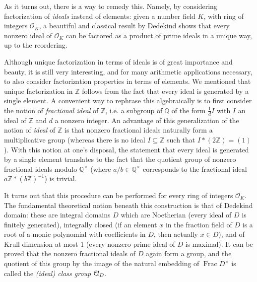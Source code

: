 \documentclass[a4paper,USenglish,cleveref, autoref, thm-restate]{lipics-v2021}
\newcommand*{\OK}[1][K]{\mathcal{O}_{#1}}
\newcommand*{\Cl}{\mathcal{C}\kern-.075em l}
\newcommand{\Q}{\mathbb{Q}}
\newcommand{\Z}{\mathbb{Z}}
\DeclareMathOperator{\Frac}{Frac}
\begin{document}
As it turns out, there is a way to remedy this. Namely, by considering factorization of \emph{ideals} instead of elements: given a number field $K$, with ring of integers $\OK$, a beautiful and classical result by Dedekind shows that every nonzero ideal of $\OK$ can be factored as a product of prime ideals in a unique way, up to the reordering.

Although unique factorization in terms of ideals is of great importance and beauty, it is still very interesting, and for many arithmetic applications necessary, to also consider factorization properties in terms of elements. We mentioned that unique factorization in $\Z$ follows from the fact that every ideal is generated by a single element. A convenient way to rephrase this algebraically is to first consider the notion of \emph{fractional ideal} of $\Z$, i.e. a subgroup of $\Q$ of the form $\frac{1}{d} I$ with $I$ an ideal of $\Z$ and $d$ a nonzero integer.
An advantage of this generalization of the notion of \emph{ideal} of $\Z$ is that nonzero fractional ideals naturally form a multiplicative group (whereas there is no ideal $I\subseteq \Z$ such that $I*(2\Z)=(1)$). With this notion at one's disposal, the statement that every ideal is generated by a single element translates to the fact that the quotient group of nonzero fractional ideals modulo $\Q^\times$ (where $a/b\in\Q^\times$ corresponds to the fractional ideal $a\Z\ast (b\Z)^{-1}$) is trivial.

It turns out that this procedure can be %
performed for every ring of integers $\OK$. The fundamental theoretical notion beneath this construction is that of Dedekind domain: these are integral domains $D$ which are Noetherian (every ideal of $D$ is finitely generated), integrally closed (if an element $x$ in the fraction field of $D$ is a root of a monic polynomial with coefficients in $D$, then actually $x \in D$), and of Krull dimension at most $1$ (every nonzero prime ideal of $D$ is maximal).
It can be proved that the nonzero fractional ideals of $D$ %
again form a group, and the quotient of this group by the image of the natural embedding of $\Frac D^\times$ is called the \emph{(ideal) class group} $\Cl_{D}$.
\end{document}
